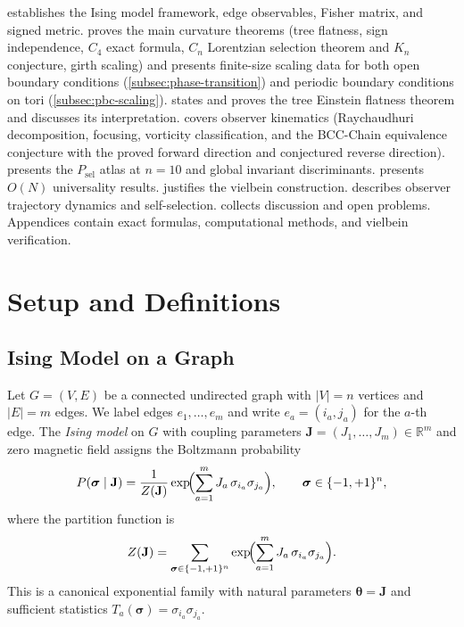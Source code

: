 \documentclass[11pt]{article}
\theoremstyle{definition}
\theoremstyle{remark}
\newcommand{\coupl}{\mathbf{J}}
\newcommand{\partf}{Z}
\begin{document}
 establishes the Ising model framework, edge observables,
Fisher matrix, and signed metric.  proves the main
curvature theorems (tree flatness, sign independence, $C_4$ exact
formula, $C_n$ Lorentzian selection theorem and $K_n$ conjecture, girth
scaling) and presents finite-size scaling data for both open boundary
conditions (\cref{subsec:phase-transition}) and periodic boundary
conditions on tori (\cref{subsec:pbc-scaling}).
 states and proves the tree Einstein flatness
theorem and discusses its interpretation. 
covers observer kinematics (Raychaudhuri decomposition, focusing, vorticity
classification, and the BCC-Chain equivalence conjecture with the proved forward direction and conjectured reverse direction).
 presents the $P_{\mathrm{sel}}$ atlas at $n = 10$
and global invariant discriminants.
 presents $O(N)$ universality
results.  justifies the vielbein construction. 
describes observer trajectory dynamics and self-selection. 
collects discussion and open problems. Appendices contain exact formulas,
computational methods, and vielbein verification.


\section{Setup and Definitions}
\label{sec:setup}

\subsection{Ising Model on a Graph}

Let $G = (V, E)$ be a connected undirected graph with $|V| = n$ vertices
and $|E| = m$ edges. We label edges $e_1, \ldots, e_m$ and write
$e_a = (i_a, j_a)$ for the $a$-th edge. The \emph{Ising model} on $G$
with coupling parameters $\coupl = (J_1, \ldots, J_m) \in \mathbb{R}^m$
and zero magnetic field assigns the Boltzmann probability
\begin{equation}
  P(\boldsymbol{\sigma} \mid \coupl)
  = \frac{1}{\partf(\coupl)} \exp\!\Bigl(
    \sum_{a=1}^{m} J_a \, \sigma_{i_a} \sigma_{j_a}
  \Bigr),
  \qquad \boldsymbol{\sigma} \in \{-1, +1\}^n,
  \label{eq:ising-model}
\end{equation}
where the partition function is
\begin{equation}
  \partf(\coupl) = \sum_{\boldsymbol{\sigma} \in \{-1,+1\}^n}
    \exp\!\Bigl(\sum_{a=1}^{m} J_a \, \sigma_{i_a} \sigma_{j_a}\Bigr).
  \label{eq:partition-function}
\end{equation}
This is a canonical exponential family with natural parameters
$\boldsymbol{\theta} = \coupl$ and sufficient statistics
$T_a(\boldsymbol{\sigma}) = \sigma_{i_a} \sigma_{j_a}$.
\end{document}
